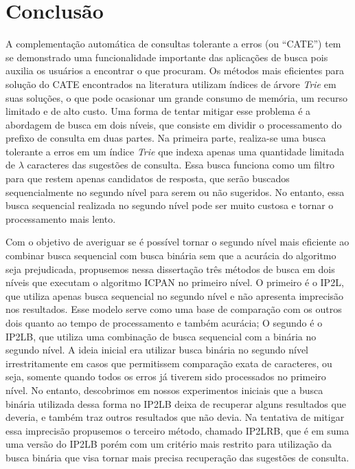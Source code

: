 \section{Conclusão}
\label{sec:conclusion}

A complementação automática de consultas tolerante a erros (ou ``CATE'') tem se demonstrado uma funcionalidade importante das aplicações de busca pois auxilia os usuários a encontrar o que procuram. Os métodos mais eficientes para solução do CATE encontrados na literatura utilizam índices de árvore \textit{Trie} em suas soluções, o que pode ocasionar um grande consumo de memória, um recurso limitado e de alto custo. Uma forma de tentar mitigar esse problema é a abordagem de busca em dois níveis, que consiste em dividir o processamento do prefixo de consulta em duas partes. Na primeira parte, realiza-se uma busca tolerante a erros em um índice \textit{Trie} que indexa apenas uma quantidade limitada de $\lambda$ caracteres das sugestões de consulta. Essa busca funciona como um filtro para que restem apenas candidatos de resposta, que serão buscados sequencialmente no segundo nível para serem ou não sugeridos. No entanto, essa busca sequencial realizada no segundo nível pode ser muito custosa e tornar o processamento mais lento. 

Com o objetivo de averiguar se é possível tornar o segundo nível mais eficiente ao combinar busca sequencial com busca binária sem que a acurácia do algoritmo seja prejudicada, propusemos nessa dissertação três métodos de busca em dois níveis que executam o algoritmo  ICPAN no primeiro nível. O primeiro é o IP2L, que utiliza apenas busca sequencial no segundo nível e não apresenta imprecisão nos resultados. Esse modelo serve como uma base de comparação com os outros dois quanto ao tempo de processamento e também acurácia; O segundo é o IP2LB, que utiliza uma combinação de busca sequencial com a binária no segundo nível. A ideia inicial era utilizar busca binária no segundo nível irrestritamente em casos que permitissem comparação exata de caracteres, ou seja, somente quando todos os erros já tiverem sido processados no primeiro nível. No entanto, descobrimos em nossos experimentos iniciais que a busca binária utilizada dessa forma no IP2LB deixa de recuperar alguns resultados que deveria, e também traz outros resultados que não devia. Na tentativa de mitigar essa imprecisão propusemos o terceiro método, chamado IP2LRB, que é em suma uma versão do IP2LB porém com um critério mais restrito para utilização da busca binária que visa tornar mais precisa recuperação das sugestões de consulta.

